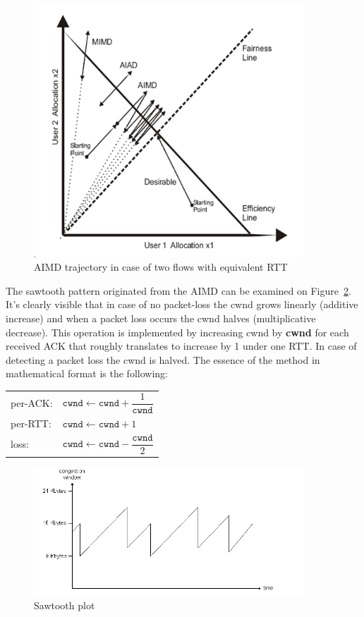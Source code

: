 \documentclass[a4paper]{article}
\begin{document}
\begin{figure}[H]
    \centering
    \includegraphics[width=0.9\textwidth]{figures/AIMD-trajectory.png}
    \caption{AIMD trajectory in case of two flows with equivalent RTT }
    \label{fig:AIMD}
\end{figure}

The sawtooth pattern originated from the AIMD can be examined on Figure~\ref{fig:sawtooth}. It's clearly visible that in case of no packet-loss the cwnd grows linearly (additive increase) and when a packet loss occurs the cwnd halves (multiplicative decrease). This operation is implemented by increasing cwnd by \textbf{cwnd} for each received ACK that roughly translates to increase by 1 under one RTT. In case of detecting a packet loss the cwnd is halved. The essence of the method in mathematical format is the following:

\begin{tabular}{ll} 
per-ACK: & $\texttt{cwnd} \leftarrow \texttt{cwnd} + \dfrac{1}{\texttt{cwnd}}$  \\
per-RTT: & $\texttt{cwnd} \leftarrow \texttt{cwnd} + 1$ \\
loss: & $\texttt{cwnd} \leftarrow \texttt{cwnd} - \dfrac{\texttt{cwnd}}{2}$ \\
\end{tabular}

\begin{figure}[H]
    \centering
    \includegraphics[width=0.9\textwidth]{figures/sawtooth.png}
    \caption{Sawtooth plot}
    \label{fig:sawtooth}
\end{figure}
\end{document}
